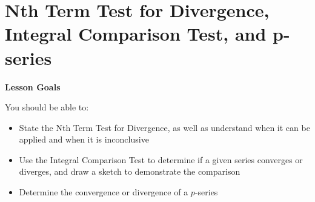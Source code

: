\documentclass[main]{subfiles}
\begin{document}
\ifSubfilesClassLoaded{%
  \chaptermark{\chaptertwo}
}{}

\section{Nth Term Test for Divergence, Integral Comparison Test, and p-series} \label{ws2-5}

\begin{framed}
\centerline{\textbf{Lesson Goals}}

You should be able to:
\begin{itemize}
\item State the Nth Term Test for Divergence, as well as understand when it can be applied and when it is inconclusive
\item Use the Integral Comparison Test to determine if a given series converges or diverges, and draw a sketch to demonstrate the comparison
\item Determine the convergence or divergence of a $p$-series
\end{itemize}
\end{framed}
\end{document}
